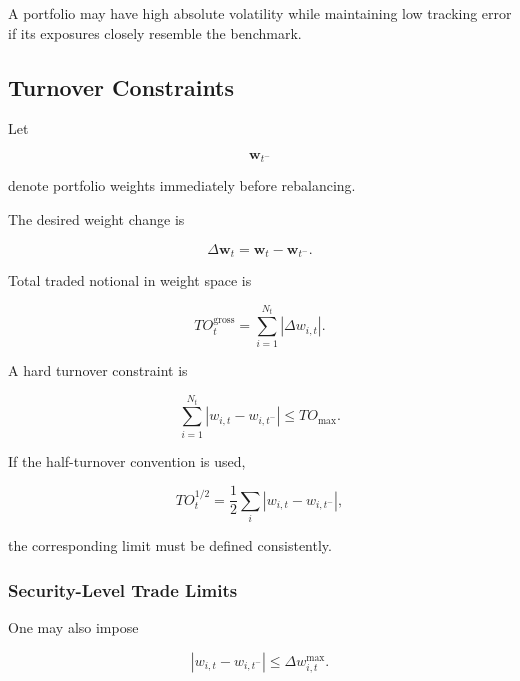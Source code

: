 \documentclass[11pt,a4paper]{article}
\begin{document}
A portfolio may have high absolute volatility while maintaining low tracking
error if its exposures closely resemble the benchmark.


\subsection{Turnover Constraints}
\label{subsec:portfolio_turnover_constraints}

Let

\begin{equation}
\mathbf{w}_{t^-}
\end{equation}

denote portfolio weights immediately before rebalancing.

The desired weight change is

\begin{equation}
\Delta\mathbf{w}_t
=
\mathbf{w}_t
-
\mathbf{w}_{t^-}.
\end{equation}

Total traded notional in weight space is

\begin{equation}
\boxed{
TO_t^{\mathrm{gross}}
=
\sum_{i=1}^{N_t}
|\Delta w_{i,t}|.
}
\end{equation}

A hard turnover constraint is

\begin{equation}
\boxed{
\sum_{i=1}^{N_t}
|w_{i,t}-w_{i,t^-}|
\leq
TO_{\max}.
}
\end{equation}

If the half-turnover convention is used,

\begin{equation}
TO_t^{1/2}
=
\frac{1}{2}
\sum_i
|w_{i,t}-w_{i,t^-}|,
\end{equation}

the corresponding limit must be defined consistently.


\subsubsection{Security-Level Trade Limits}

One may also impose

\begin{equation}
\boxed{
|w_{i,t}-w_{i,t^-}|
\leq
\Delta w_{i,t}^{\max}.
}
\end{equation}
\end{document}
